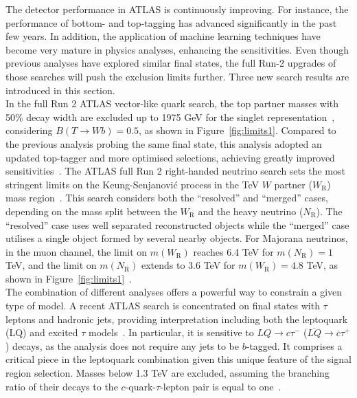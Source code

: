 \documentclass{moriond}
\begin{document}
The detector performance in ATLAS is continuously improving. For instance, the
performance of bottom- and top-tagging has advanced significantly in the past
few years. In addition, the application of machine learning techniques have
become very mature in physics analyses, enhancing the sensitivities. Even
though previous analyses have explored similar final states, the full Run-2
upgrades of those searches will push the exclusion limits further. Three new
search results are introduced in this section.\\

In the full Run 2 ATLAS vector-like quark search, the top partner masses with
50\% decay width are excluded up to 1975 GeV for the singlet representation~\cite{vlq},
considering $B(T\rightarrow Wb)=0.5$, as shown in
Figure~\ref{fig:limits1}. Compared to the previous analysis
probing the same final state, this analysis adopted an updated top-tagger and
more optimised selections, achieving greatly improved sensitivities~\cite{vlq}.
The ATLAS full Run 2 right-handed neutrino search sets the most stringent
limits on the Keung-Senjanovi\'c process in the TeV $W$ partner
($W_{\mathrm{R}}$) mass region~\cite{rhn}. This search considers both the ``resolved'' and
``merged'' cases, depending on the mass split between the $W_{\mathrm{R}}$ and
the heavy neutrino ($N_{\mathrm{R}}$). The ``resolved'' case uses well
separated reconstructed objects while the ``merged'' case utilises a single object
formed by several nearby objects. For Majorana neutrinos, in the muon channel,
the limit on $m(W_{\mathrm{R}})$ reaches 6.4 TeV for $m(N_{\mathrm{R}})=1$ TeV,
and the limit on $m(N_{\mathrm{R}})$ extends to 3.6 TeV for
$m(W_{\mathrm{R}})=4.8$ TeV, as shown in
Figure~\ref{fig:limits1}~\cite{rhn}.\\           

The combination of different analyses offers a powerful way to constrain a given
type of model. A recent ATLAS search is concentrated on final states with
$\tau$ leptons and hadronic jets, providing interpretation including both the
leptoquark (LQ) and excited $\tau$ models~\cite{tau}. In particular, it is sensitive to
$LQ\rightarrow c\tau^{-}$ ($\overline{LQ}\rightarrow\overline{c}\tau^{+}$)
decays, as the analysis does not require any jets to be $b$-tagged. It
comprises a critical piece in the leptoquark combination given this unique
feature of the signal region selection. Masses below 1.3 TeV are excluded,
assuming the branching ratio of their decays to the $c$-quark-$\tau$-lepton
pair is equal to one~\cite{tau}.\\   
\end{document}

